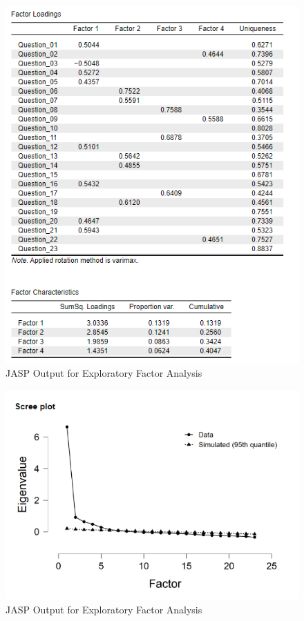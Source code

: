 \documentclass[
]{book}
\begin{document}
\begin{figure}[!h]
\includegraphics{Screenshots/Exploratory Factor Analysis/efaJASP2} \caption{\label{fig:efaJASP2}JASP Output for Exploratory Factor Analysis}\label{fig:efaJASP2}
\end{figure}

\begin{figure}[!h]
\includegraphics{Screenshots/Exploratory Factor Analysis/efaJASP3} \caption{\label{fig:efaJASP3}JASP Output for Exploratory Factor Analysis}\label{fig:efaJASP3}
\end{figure}
\end{document}
